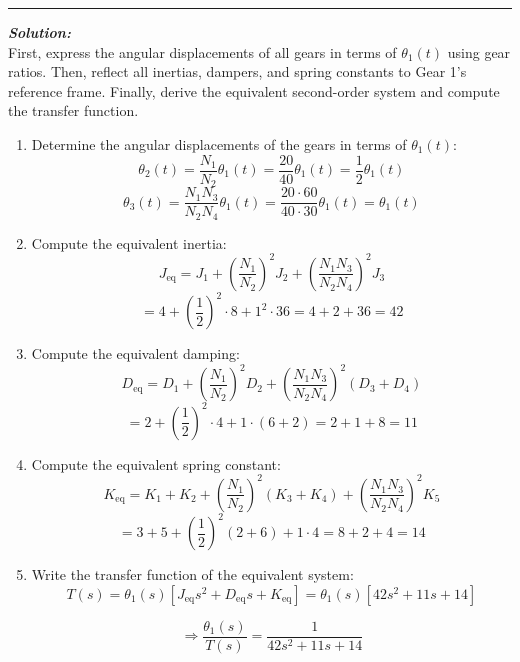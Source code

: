 \documentclass[11pt]{article}
\begin{document}
\noindent\rule{\textwidth}{1pt}

\vspace{12pt}

\noindent \textbf{\textit{Solution:}}
\\ First, express the angular displacements of all gears in terms of \( \theta_1(t) \) using gear ratios. Then, reflect all inertias, dampers, and spring constants to Gear 1’s reference frame. Finally, derive the equivalent second-order system and compute the transfer function.

\begin{enumerate}[label=(\alph*), itemindent=*, leftmargin=*, nolistsep]
    \item Determine the angular displacements of the gears in terms of \( \theta_1(t) \):
    \[
    \theta_2(t) = \frac{N_1}{N_2} \theta_1(t) = \frac{20}{40} \theta_1(t) = \frac{1}{2} \theta_1(t)
    \]
    \[
    \theta_3(t) = \frac{N_1 N_3}{N_2 N_4} \theta_1(t) = \frac{20 \cdot 60}{40 \cdot 30} \theta_1(t) = \theta_1(t)
    \]
    
    \item Compute the equivalent inertia:
    \[
    J_{\text{eq}} = J_1 + \left(\frac{N_1}{N_2}\right)^2 J_2 + \left(\frac{N_1 N_3}{N_2 N_4}\right)^2 J_3
    \]
    \[
    = 4 + \left(\frac{1}{2}\right)^2 \cdot 8 + 1^2 \cdot 36 = 4 + 2 + 36 = \boxed{42}
    \]
    
    \item Compute the equivalent damping:
    \[
    D_{\text{eq}} = D_1 + \left(\frac{N_1}{N_2}\right)^2 D_2 + \left(\frac{N_1 N_3}{N_2 N_4}\right)^2 (D_3 + D_4)
    \]
    \[
    = 2 + \left(\frac{1}{2}\right)^2 \cdot 4 + 1 \cdot (6 + 2) = 2 + 1 + 8 = \boxed{11}
    \]
    
    \item Compute the equivalent spring constant:
    \[
    K_{\text{eq}} = K_1 + K_2 + \left(\frac{N_1}{N_2}\right)^2 (K_3 + K_4) + \left(\frac{N_1 N_3}{N_2 N_4}\right)^2 K_5
    \]
    \[
    = 3 + 5 + \left(\frac{1}{2}\right)^2 (2 + 6) + 1 \cdot 4 = 8 + 2 + 4 = \boxed{14}
    \]
    
    \item Write the transfer function of the equivalent system:
    \[
    T(s) = \theta_1(s) \left[ J_{\text{eq}} s^2 + D_{\text{eq}} s + K_{\text{eq}} \right]
    = \theta_1(s) \left[ 42 s^2 + 11 s + 14 \right]
    \]
    
    \[
    \Rightarrow \boxed{
    \frac{\theta_1(s)}{T(s)} = \frac{1}{42 s^2 + 11 s + 14}
    }
    \]
\end{enumerate}
\end{document}
